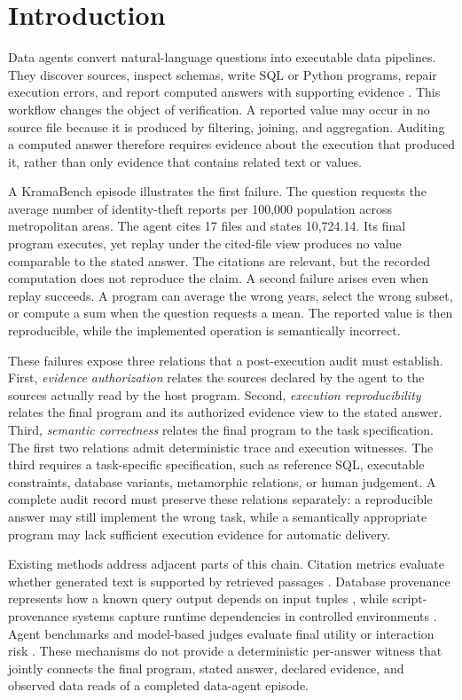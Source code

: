 \section{Introduction}\label{sec:intro}

Data agents convert natural-language questions into executable
data pipelines. They discover sources, inspect schemas, write SQL
or Python programs, repair execution errors, and report computed
answers with supporting evidence
\citep{kramabench2025,dabstep2025,lakeqa2026}.
This workflow changes the object of verification. A reported value
may occur in no source file because it is produced by filtering,
joining, and aggregation. Auditing a computed answer therefore
requires evidence about the execution that produced it, rather than
only evidence that contains related text or values.

A KramaBench episode illustrates the first failure. The question
requests the average number of identity-theft reports per 100,000
population across metropolitan areas. The agent cites 17 files and
states 10,724.14. Its final program executes, yet replay under the
cited-file view produces no value comparable to the stated answer.
The citations are relevant, but the recorded computation does not
reproduce the claim. A second failure arises even when replay
succeeds. A program can average the wrong years, select the wrong
subset, or compute a sum when the question requests a mean. The
reported value is then reproducible, while the implemented operation
is semantically incorrect.

These failures expose three relations that a post-execution audit
must establish. First, \emph{evidence authorization} relates the
sources declared by the agent to the sources actually read by the
host program. Second, \emph{execution reproducibility} relates the
final program and its authorized evidence view to the stated answer.
Third, \emph{semantic correctness} relates the final program to the
task specification. The first two relations admit deterministic
trace and execution witnesses. The third requires a task-specific
specification, such as reference SQL, executable constraints,
database variants, metamorphic relations, or human judgement.
A complete audit record must preserve these relations separately:
a reproducible answer may still implement the wrong task, while a
semantically appropriate program may lack sufficient execution
evidence for automatic delivery.

Existing methods address adjacent parts of this chain. Citation
metrics evaluate whether generated text is supported by retrieved
passages \citep{gao2023alce,min2023factscore}. Database provenance
represents how a known query output depends on input tuples
\citep{green2007provenance,cheney2009provenance,
amsterdamer2011aggregate}, while script-provenance systems capture
runtime dependencies in controlled environments
\citep{murta2014noworkflow,namaki2020vamsa}. Agent benchmarks and
model-based judges evaluate final utility or interaction risk
\citep{ruan2024toolemu,debenedetti2024agentdojo,kramabench2025,
sana2026}. These mechanisms do not provide a deterministic
per-answer witness that jointly connects the final program, stated
answer, declared evidence, and observed data reads of a completed
data-agent episode.

